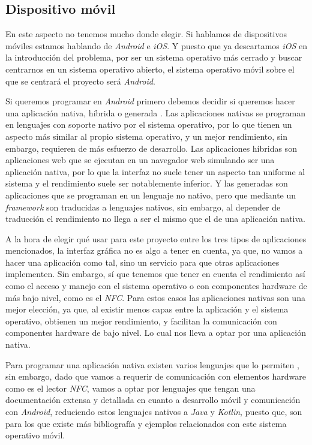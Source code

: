 \subsection{Dispositivo móvil}

En este aspecto no tenemos mucho donde elegir. Si hablamos de dispositivos
móviles estamos hablando de \emph{Android} e \emph{iOS}. Y puesto que ya
descartamos \emph{iOS} en la introducción del problema, por ser un sistema
operativo más cerrado y buscar centrarnos en un sistema operativo abierto, el
sistema operativo móvil sobre el que se centrará el proyecto será \emph{Android}.

Si queremos programar en \emph{Android} primero debemos decidir si queremos hacer una
aplicación nativa, híbrida o generada \cite{nativo-hibrido-generado}. Las
aplicaciones nativas se programan en lenguajes con soporte nativo por el sistema
operativo, por lo que tienen un aspecto más similar al propio sistema operativo,
y un mejor rendimiento, sin embargo, requieren de más esfuerzo de desarrollo. Las
aplicaciones híbridas son aplicaciones web que se ejecutan en un navegador web
simulando ser una aplicación nativa, por lo que la interfaz no suele tener un
aspecto tan uniforme al sistema y el rendimiento suele ser notablemente
inferior. Y las generadas son aplicaciones que se programan en un lenguaje no
nativo, pero que mediante un \emph{framework} son traducidas a lenguajes nativos, sin
embargo, al depender de traducción el rendimiento no llega a ser el mismo que el
de una aplicación nativa.

A la hora de elegir qué usar para este proyecto entre los tres tipos de
aplicaciones mencionados, la interfaz gráfica no es algo a tener en cuenta, ya
que, no vamos a hacer una aplicación como tal, sino un servicio para que otras
aplicaciones implementen. Sin embargo, sí que tenemos que tener en cuenta el
rendimiento así como el acceso y manejo con el sistema operativo o con
componentes hardware de más bajo nivel, como es el \emph{NFC}. Para estos casos las
aplicaciones nativas son una mejor elección, ya que, al existir menos capas entre
la aplicación y el sistema operativo, obtienen un mejor rendimiento, y facilitan
la comunicación con componentes hardware de bajo nivel. Lo cual nos lleva a
optar por una aplicación nativa.

Para programar una aplicación nativa existen varios lenguajes que lo permiten
\cite{lenguajes-nativos}, sin embargo, dado que vamos a requerir de comunicación
con elementos hardware como es el lector \emph{NFC}, vamos a optar por lenguajes
que tengan una documentación extensa y detallada en cuanto a desarrollo móvil y
comunicación con \emph{Android}, reduciendo estos lenguajes nativos a \emph{Java} y
\emph{Kotlin}, puesto que, son para los que existe más bibliografía y ejemplos
relacionados con este sistema operativo móvil.

